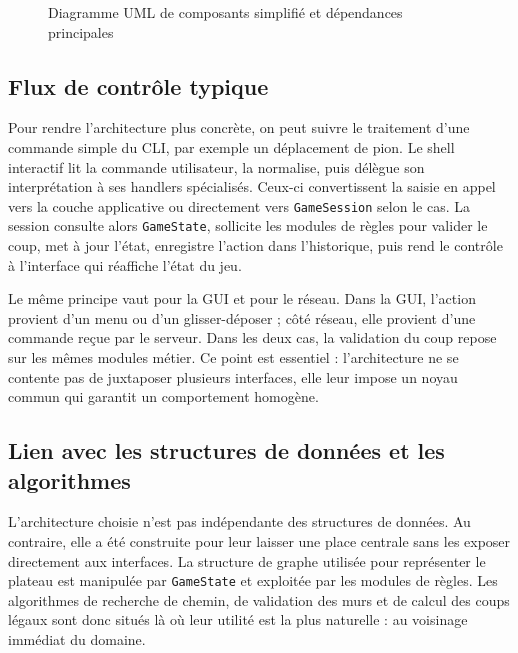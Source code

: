 \begin{figure}[!ht]
  \caption{Diagramme UML de composants simplifié et dépendances principales}
  \label{fig:architecture-key-components}
\end{figure}

\subsection{Flux de contrôle typique}

Pour rendre l'architecture plus concrète, on peut suivre le traitement d'une
commande simple du CLI, par exemple un déplacement de pion. Le shell
interactif lit la commande utilisateur, la normalise, puis délègue son
interprétation à ses handlers spécialisés. Ceux-ci convertissent la saisie en
appel vers la couche applicative ou directement vers \texttt{GameSession} selon
le cas. La session consulte alors \texttt{GameState}, sollicite les modules de
règles pour valider le coup, met à jour l'état, enregistre l'action dans
l'historique, puis rend le contrôle à l'interface qui réaffiche l'état du jeu.

Le même principe vaut pour la GUI et pour le réseau. Dans la GUI, l'action
provient d'un menu ou d'un glisser-déposer ; côté réseau, elle provient d'une
commande reçue par le serveur. Dans les deux cas, la validation du coup repose
sur les mêmes modules métier. Ce point est essentiel : l'architecture ne se
contente pas de juxtaposer plusieurs interfaces, elle leur impose un noyau
commun qui garantit un comportement homogène.

\subsection{Lien avec les structures de données et les algorithmes}

L'architecture choisie n'est pas indépendante des structures de données.
Au contraire, elle a été construite pour leur laisser une place centrale sans
les exposer directement aux interfaces. La structure de graphe utilisée pour
représenter le plateau est manipulée par \texttt{GameState} et exploitée par
les modules de règles. Les algorithmes de recherche de chemin, de validation
des murs et de calcul des coups légaux sont donc situés là où leur utilité est
la plus naturelle : au voisinage immédiat du domaine.

